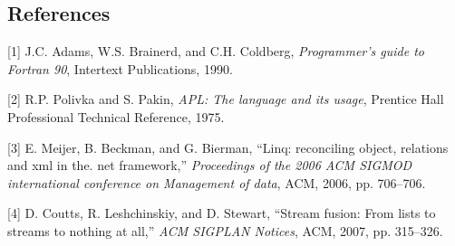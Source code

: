 \subsection{References}

{[}1{]} J.C. Adams, W.S. Brainerd, and C.H. Coldberg, \emph{Programmer's
guide to Fortran 90}, Intertext Publications, 1990.

{[}2{]} R.P. Polivka and S. Pakin, \emph{APL: The language and its
usage}, Prentice Hall Professional Technical Reference, 1975.

{[}3{]} E. Meijer, B. Beckman, and G. Bierman, ``Linq: reconciling
object, relations and xml in the. net framework,'' \emph{Proceedings of
the 2006 ACM SIGMOD international conference on Management of data},
ACM, 2006, pp. 706--706.

{[}4{]} D. Coutts, R. Leshchinskiy, and D. Stewart, ``Stream fusion:
From lists to streams to nothing at all,'' \emph{ACM SIGPLAN Notices},
ACM, 2007, pp. 315--326.
